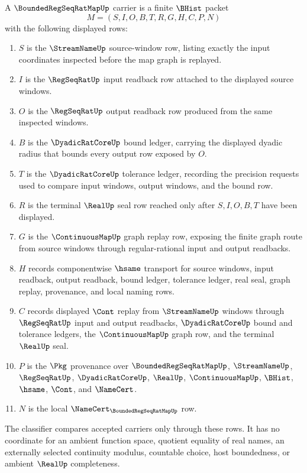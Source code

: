 \begin{definition}
\label{def:bounded-regseqrat-map-carrier}
A $\BoundedRegSeqRatMapUp$ carrier is a finite $\BHist$ packet
$$
M=(S,I,O,B,T,R,G,H,C,P,N)
$$
with the following displayed rows:
\begin{enumerate}
\item $S$ is the $\StreamNameUp$ source-window row, listing exactly the input coordinates inspected before the map graph is replayed.
\item $I$ is the $\RegSeqRatUp$ input readback row attached to the displayed source windows.
\item $O$ is the $\RegSeqRatUp$ output readback row produced from the same inspected windows.
\item $B$ is the $\DyadicRatCoreUp$ bound ledger, carrying the displayed dyadic radius that bounds every output row exposed by $O$.
\item $T$ is the $\DyadicRatCoreUp$ tolerance ledger, recording the precision requests used to compare input windows, output windows, and the bound row.
\item $R$ is the terminal $\RealUp$ seal row reached only after $S,I,O,B,T$ have been displayed.
\item $G$ is the $\ContinuousMapUp$ graph replay row, exposing the finite graph route from source windows through regular-rational input and output readbacks.
\item $H$ records componentwise $\hsame$ transport for source windows, input readback, output readback, bound ledger, tolerance ledger, real seal, graph replay, provenance, and local naming rows.
\item $C$ records displayed $\Cont$ replay from $\StreamNameUp$ windows through $\RegSeqRatUp$ input and output readbacks, $\DyadicRatCoreUp$ bound and tolerance ledgers, the $\ContinuousMapUp$ graph row, and the terminal $\RealUp$ seal.
\item $P$ is the $\Pkg$ provenance over $\BoundedRegSeqRatMapUp$, $\StreamNameUp$, $\RegSeqRatUp$, $\DyadicRatCoreUp$, $\RealUp$, $\ContinuousMapUp$, $\BHist$, $\hsame$, $\Cont$, and $\NameCert$.
\item $N$ is the local $\NameCert_{\BoundedRegSeqRatMapUp}$ row.
\end{enumerate}
The classifier compares accepted carriers only through these rows. It has no coordinate for an ambient function space, quotient equality of real names, an externally selected continuity modulus, countable choice, host boundedness, or ambient $\RealUp$ completeness.
\end{definition}

